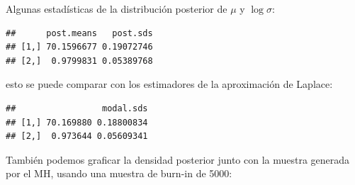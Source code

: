 \documentclass[
  12pt,
]{book}
\newenvironment{Shaded}{\begin{snugshade}}{\end{snugshade}}
\newcommand{\AttributeTok}[1]{\textcolor[rgb]{0.77,0.63,0.00}{#1}}
\newcommand{\DecValTok}[1]{\textcolor[rgb]{0.00,0.00,0.81}{#1}}
\newcommand{\FloatTok}[1]{\textcolor[rgb]{0.00,0.00,0.81}{#1}}
\newcommand{\FunctionTok}[1]{\textcolor[rgb]{0.00,0.00,0.00}{#1}}
\newcommand{\NormalTok}[1]{#1}
\newcommand{\OtherTok}[1]{\textcolor[rgb]{0.56,0.35,0.01}{#1}}
\newcommand{\SpecialCharTok}[1]{\textcolor[rgb]{0.00,0.00,0.00}{#1}}
\newcommand{\StringTok}[1]{\textcolor[rgb]{0.31,0.60,0.02}{#1}}
\theoremstyle{definition}
\theoremstyle{definition}
\theoremstyle{definition}
\theoremstyle{definition}
\theoremstyle{remark}
\begin{document}
Algunas estadísticas de la distribución posterior de \(\mu\) y \(\log \sigma\):

\begin{Shaded}
\end{Shaded}

\begin{verbatim}
##      post.means   post.sds
## [1,] 70.1596677 0.19072746
## [2,]  0.9799831 0.05389768
\end{verbatim}

esto se puede comparar con los estimadores de la aproximación de Laplace:

\begin{Shaded}
\end{Shaded}

\begin{verbatim}
##                 modal.sds
## [1,] 70.169880 0.18800834
## [2,]  0.973644 0.05609341
\end{verbatim}

También podemos graficar la densidad posterior junto con la muestra generada por el MH, usando una muestra de burn-in de 5000:

\begin{Shaded}
\end{Shaded}
\end{document}
